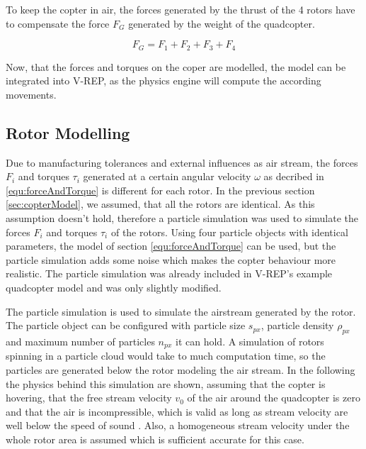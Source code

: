     To keep the copter in air, the forces generated by the thrust of the 4 rotors have to compensate the force $F_{G}$ generated by the weight of the quadcopter.
    
    \begin{equation}
    F_G = F_1 + F_2 +F_3 + F_4
    \end{equation}
    
    Now, that the forces and torques on the coper are modelled, the model can be integrated into V-REP, as the physics engine will compute the according movements.
    
    
    \subsection{Rotor Modelling}
    \label{sec:theoryRotor}
    
    Due to manufacturing tolerances and external influences as air stream, the forces $F_i$ and torques $\tau_i$ generated at a certain angular velocity $\omega$ as decribed in \ref{equ:forceAndTorque} is different for each rotor. 
    In the previous section \ref{sec:copterModel}, we assumed, that all the rotors are identical. 
    As this assumption doesn't hold, therefore a particle simulation was used to simulate the forces $F_i$ and torques $\tau_i$ of the rotors. 
    Using four particle objects with identical parameters, the model of section \ref{equ:forceAndTorque} can be used, but the particle simulation adds some noise which makes the copter behaviour more realistic. 
    The particle simulation was already included in V-REP's example quadcopter model and was only slightly modified.
    
    The particle simulation is used to simulate the airstream generated by the rotor. 
    The particle object can be configured with  particle size $s_{px}$, particle density $\rho_{px}$ and maximum number of particles $n_{px}$ it can hold. 
    A simulation of rotors spinning in a particle cloud would take to much computation time, so the  particles are generated below the rotor modeling the air stream. 
    In the following the physics behind this simulation are shown, assuming that the copter is hovering, that the free stream velocity $v_0$ of the air around the quadcopter is zero and that the air is incompressible, which is valid as long as stream velocity are well below the speed of sound \cite{Lautrup2011PhysicsContinuous}.
     Also, a homogeneous stream velocity under the whole rotor area is assumed which is sufficient accurate for this case. 
    
